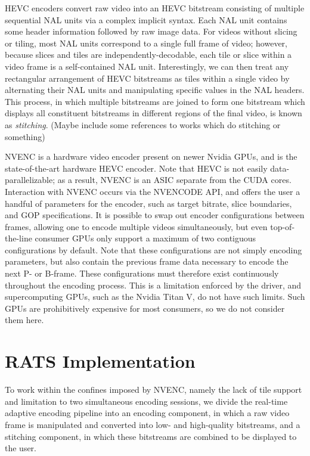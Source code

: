 HEVC encoders convert raw video into an HEVC bitstream consisting of multiple sequential NAL units via a complex implicit syntax. Each NAL unit contains some header information followed by raw image data. For videos without slicing or tiling, most NAL units correspond to a single full frame of video; however, because slices and tiles are independently-decodable, each tile or slice within a video frame is a self-contained NAL unit. Interestingly, we can then treat any rectangular arrangement of HEVC bitstreams as tiles within a single video by alternating their NAL units and manipulating specific values in the NAL headers. This process, in which multiple bitstreams are joined to form one bitstream which displays all constituent bitstreams in different regions of the final video, is known as \textit{stitching}. (Maybe include some references to works which do stitching or something)

NVENC is a hardware video encoder present on newer Nvidia GPUs, and is the state-of-the-art hardware HEVC encoder. Note that HEVC is not easily data-parallelizable; as a result, NVENC is an ASIC separate from the CUDA cores. Interaction with NVENC occurs via the NVENCODE API, and offers the user a handful of parameters for the encoder, such as target bitrate, slice boundaries, and GOP specifications. It is possible to swap out encoder configurations between frames, allowing one to encode multiple videos simultaneously, but even top-of-the-line consumer GPUs only support a maximum of two contiguous configurations by default. Note that these configurations are not simply encoding parameters, but also contain the previous frame data necessary to encode the next P- or B-frame. These configurations must therefore exist continuously throughout the encoding process. This is a limitation enforced by the driver, and supercomputing GPUs, such as the Nvidia Titan V, do not have such limits. Such GPUs are prohibitively expensive for most consumers, so we do not consider them here.

\section{RATS Implementation}
To work within the confines imposed by NVENC, namely the lack of tile support and limitation to two simultaneous encoding sessions, we divide the real-time adaptive encoding pipeline into an encoding component, in which a raw video frame is manipulated and converted into low- and high-quality bitstreams, and a stitching component, in which these bitstreams are combined to be displayed to the user.

